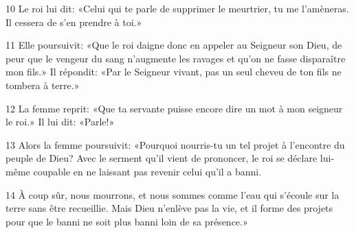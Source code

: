 
10 Le roi lui dit: «Celui qui te parle de supprimer le meurtrier, tu me l’amèneras. Il cessera de s’en prendre à toi.»

11 Elle poursuivit: «Que le roi daigne donc en appeler au Seigneur son Dieu, de peur que le vengeur du sang n’augmente les ravages et qu’on ne fasse disparaître mon fils.» Il répondit: «Par le Seigneur vivant, pas un seul cheveu de ton fils ne tombera à terre.»

12 La femme reprit: «Que ta servante puisse encore dire un mot à mon seigneur le roi.» Il lui dit: «Parle!»

13 Alors la femme poursuivit: «Pourquoi nourris-tu un tel projet à l’encontre du peuple de Dieu? Avec le serment qu’il vient de prononcer, le roi se déclare lui-même coupable en ne laissant pas revenir celui qu’il a banni.

14 À coup sûr, nous mourrons, et nous sommes comme l’eau qui s’écoule sur la terre sans être recueillie. Mais Dieu n’enlève pas la vie, et il forme des projets pour que le banni ne soit plus banni loin de sa présence.»
